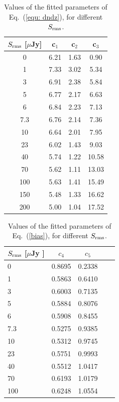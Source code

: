 \documentclass[useAMS,usenatbib]{mn2e}
\begin{document}
\begin{table}
\begin{center}
\caption{Values of the fitted parameters of Eq.~(\ref{equ: dndz}), for different $S_{\rm{rms}}$.}
\label{table:free_parameters}
\begin{tabular}{|c|c|c|c|}
\hline 
$S_{\rm rms}$ [$ \mu $Jy]& c$_1$ & c$_2$ &c$_3$      \\ 
\hline 
0 & 6.21 & 1.63 & 0.90\\
\hline
 1  & 7.33 & 3.02 &  5.34 \\
\hline
 3 & 6.91 & 2.38 &  5.84 \\
\hline
5  & 6.77 & 2.17 & 6.63 \\
\hline
 6 & 6.84 & 2.23 &  7.13 \\
\hline
7.3 & 6.76 & 2.14 &  7.36 \\
\hline
10 &  6.64 & 2.01 &  7.95 \\
\hline
23 & 6.02  & 1.43 &  9.03 \\
\hline
40 & 5.74 & 1.22 &  10.58 \\
\hline
70  &5.62 & 1.11 &  13.03 \\
\hline
100 &  5.63 & 1.41 & 15.49 \\
\hline
150  & 5.48 & 1.33 & 16.62 \\
\hline
200 & 5.00 &1.04 & 17.52 \\
\hline
\end{tabular} 
\end{center}
\end{table}
\begin{table}
\begin{center}
\caption{Values of the fitted parameters of Eq.~(\ref{bias}), for different $S_{\rm{rms}}$.}
\label{table:free_parameters_bias}
\begin{tabular}{@{}lcccc}
\hline
$S_{\rm rms}$ [$\mu$Jy ]& $c_4$& $c_5$ \\
\hline
0  & 0.8695 &    0.2338 \\
\hline
 1& 0.5863 &    0.6410 \\
\hline
3  & 0.6003 &     0.7135 \\
\hline
5  & 0.5884 &    0.8076 \\
\hline
6 & 0.5908 &  0.8455 \\
\hline
7.3 & 0.5275 & 0.9385 \\
\hline
10 & 0.5312 &     0.9745 \\
\hline
23 &0.5751 &  0.9993 \\
\hline
40 & 0.5512 &    1.0417 \\
\hline
70  & 0.6193 &    1.0179 \\
\hline
100 &0.6248 & 1.0554 \\
\hline
\end{tabular}
\end{center} 
\end{table}
\end{document}
